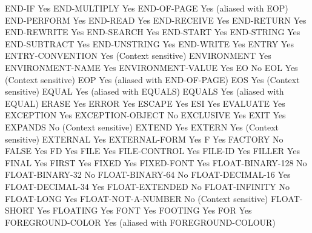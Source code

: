 END-IF                          Yes
END-MULTIPLY                    Yes
END-OF-PAGE                     Yes (aliased with EOP)
END-PERFORM                     Yes
END-READ                        Yes
END-RECEIVE                     Yes
END-RETURN                      Yes
END-REWRITE                     Yes
END-SEARCH                      Yes
END-START                       Yes
END-STRING                      Yes
END-SUBTRACT                    Yes
END-UNSTRING                    Yes
END-WRITE                       Yes
ENTRY                           Yes
ENTRY-CONVENTION                Yes (Context sensitive)
ENVIRONMENT                     Yes
ENVIRONMENT-NAME                Yes
ENVIRONMENT-VALUE               Yes
EO                              No
EOL                             Yes (Context sensitive)
EOP                             Yes (aliased with END-OF-PAGE)
EOS                             Yes (Context sensitive)
EQUAL                           Yes (aliased with EQUALS)
EQUALS                          Yes (aliased with EQUAL)
ERASE                           Yes
ERROR                           Yes
ESCAPE                          Yes
ESI                             Yes
EVALUATE                        Yes
EXCEPTION                       Yes
EXCEPTION-OBJECT                No
EXCLUSIVE                       Yes
EXIT                            Yes
EXPANDS                         No (Context sensitive)
EXTEND                          Yes
EXTERN                          Yes (Context sensitive)
EXTERNAL                        Yes
EXTERNAL-FORM                   Yes
F                               Yes
FACTORY                         No
FALSE                           Yes
FD                              Yes
FILE                            Yes
FILE-CONTROL                    Yes
FILE-ID                         Yes
FILLER                          Yes
FINAL                           Yes
FIRST                           Yes
FIXED                           Yes
FIXED-FONT                      Yes
FLOAT-BINARY-128                No
FLOAT-BINARY-32                 No
FLOAT-BINARY-64                 No
FLOAT-DECIMAL-16                Yes
FLOAT-DECIMAL-34                Yes
FLOAT-EXTENDED                  No
FLOAT-INFINITY                  No
FLOAT-LONG                      Yes
FLOAT-NOT-A-NUMBER              No (Context sensitive)
FLOAT-SHORT                     Yes
FLOATING                        Yes
FONT                            Yes
FOOTING                         Yes
FOR                             Yes
FOREGROUND-COLOR                Yes (aliased with FOREGROUND-COLOUR)
